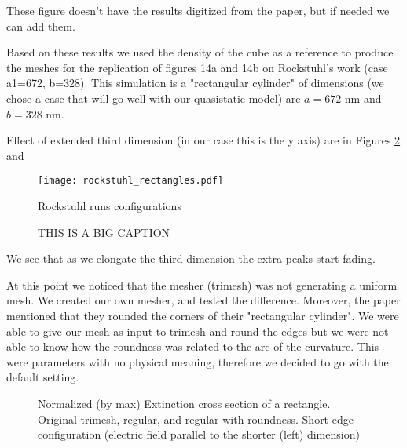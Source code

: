 These figure doesn't have the results digitized from the paper, but if needed we can add them. 

Based on these results we used the density of the cube as a reference to produce the meshes for the replication 
of figures 14a and 14b on Rockstuhl's work (case a1=672, b=328). This simulation is a "rectangular cylinder" of 
dimensions (we chose a case that will go well with our quasistatic model) are $a=672$ nm and $b=328$ nm. 

Effect of extended third dimension (in our case this is the y axis) are in Figures \ref{fig:ext_y_14} and


\begin{figure}
    \centering
    \texttt{[image: rockstuhl\_rectangles.pdf]} 
    \caption{Rockstuhl runs configurations}
    \label{fig:rectangle_sketch}
\end{figure}

\begin{figure}
    \centering
    \caption{THIS IS A BIG CAPTION}
    \label{fig:ext_y_14}   
 \end{figure}


We see that as we elongate the third dimension the extra peaks start fading. 

At this point we noticed that the mesher (trimesh) was not generating a uniform mesh. We created our 
own mesher, and tested the difference. Moreover, the paper mentioned that they rounded the corners of their
"rectangular cylinder". We were able to give our mesh as input to trimesh and round the edges but we were not able 
to know how the roundness was related to the arc of the curvature. This were parameters with no physical meaning, 
therefore we decided to go with the default setting. 


\begin{figure}
    \centering
    \caption{Normalized (by max) Extinction cross section of a rectangle. Original trimesh, regular, and regular with 
    roundness. Short edge configuration (electric field parallel to the shorter (left) dimension)}
    \label{fig:tri_reg_round_14}
 \end{figure}


